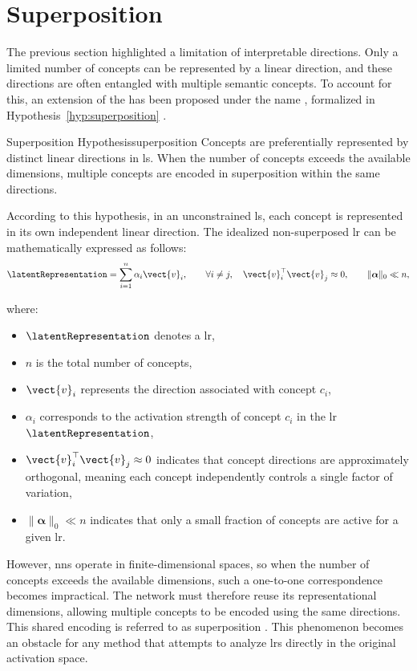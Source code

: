 \section{Superposition}
\label{sec:superposition}

The previous section highlighted a limitation of interpretable directions.
Only a limited number of concepts can be represented by a linear direction, and these directions are often entangled with multiple semantic concepts.
To account for this, an extension of the \ConceptHypothesisName has been proposed under the name \SuperpositionHypothesisName, formalized in Hypothesis~\ref{hyp:superposition} \parencite{elhage2022superposition}.

\begin{hypothesis}{Superposition Hypothesis}{superposition}
Concepts are preferentially represented by distinct linear directions in \gls{ls}.
When the number of concepts exceeds the available dimensions, multiple concepts are encoded in superposition within the same directions.
\end{hypothesis}

According to this hypothesis, in an unconstrained \gls{ls}, each concept is represented in its own independent linear direction.
The idealized non-superposed \gls{lr} can be mathematically expressed as follows:
\[
\latentRepresentation = \sum_{i=1}^{n} \alpha_i \vect{v}_i,
\qquad
\forall i \neq j,\quad \vect{v}_i^\top \vect{v}_j \approx 0,
\qquad
\|\boldsymbol{\alpha}\|_0 \ll n,
\]

where:
\begin{itemize}
    \item $\latentRepresentation$ denotes a \gls{lr},
    \item $n$ is the total number of concepts,
    \item $\vect{v}_i$ represents the direction associated with concept $c_i$,
    \item $\alpha_i$ corresponds to the activation strength of concept $c_i$ in the \gls{lr} $\latentRepresentation$,
    \item $\vect{v}_i^\top \vect{v}_j \approx 0$ indicates that concept directions are approximately orthogonal, meaning each concept independently controls a single factor of variation,
    \item $\|\boldsymbol{\alpha}\|_0 \ll n$ indicates that only a small fraction of concepts are active for a given \gls{lr}.
\end{itemize}

However, \glspl{nn} operate in finite-dimensional spaces, so when the number of concepts exceeds the available dimensions, such a one-to-one correspondence becomes impractical.
The network must therefore reuse its representational dimensions, allowing multiple concepts to be encoded using the same directions.
This shared encoding is referred to as superposition \parencite{bricken2023monosemanticity}.
This phenomenon becomes an obstacle for any method that attempts to analyze \glspl{lr} directly in the original activation space.

